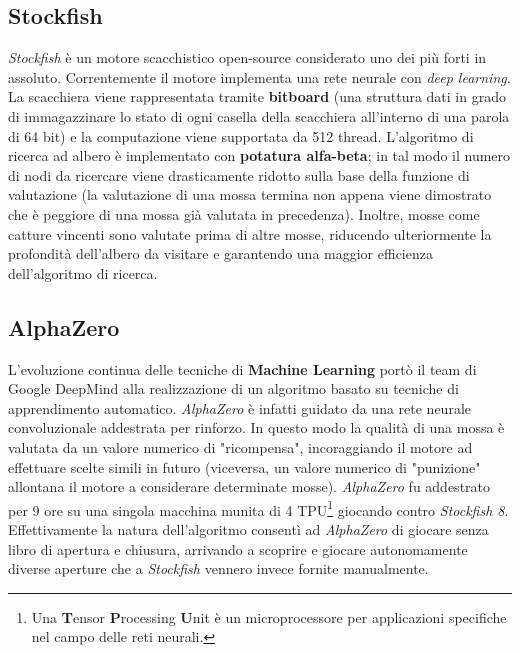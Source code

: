 \subsection{Stockfish}
\textit{Stockfish} è un motore scacchistico open-source considerato uno dei più forti in assoluto. Correntemente il motore implementa una rete neurale con \textit{deep learning}. La scacchiera viene rappresentata tramite \textbf{bitboard} (una struttura dati in grado di immagazzinare lo stato di ogni casella della scacchiera all’interno di una parola di 64 bit) e la computazione viene supportata da 512 thread. L'algoritmo di ricerca ad albero è implementato con \textbf{potatura alfa-beta}; in tal modo il numero di nodi da ricercare viene drasticamente ridotto sulla base della funzione di valutazione (la valutazione di una mossa termina non appena viene dimostrato che è peggiore di una mossa già valutata in precedenza). Inoltre, mosse come catture vincenti sono valutate prima di altre mosse, riducendo ulteriormente la profondità dell'albero da visitare e garantendo una maggior efficienza dell'algoritmo di ricerca\cite{enwiki:1105171756}.

\subsection{AlphaZero}
L'evoluzione continua delle tecniche di \textbf{Machine Learning} portò il team di Google DeepMind alla realizzazione di un algoritmo basato su tecniche di apprendimento automatico. \textit{AlphaZero} è infatti guidato da una rete neurale convoluzionale addestrata per rinforzo. In questo modo la qualità di una mossa è valutata da un valore numerico di "ricompensa", incoraggiando il motore ad effettuare scelte simili in futuro (viceversa, un valore numerico di "punizione" allontana il motore a considerare determinate mosse). \textit{AlphaZero} fu addestrato per 9 ore su una singola macchina munita di 4 TPU\footnote{Una \textbf{T}ensor \textbf{P}rocessing \textbf{U}nit è un microprocessore per applicazioni specifiche nel campo delle reti neurali.} giocando contro \textit{Stockfish 8}. Effettivamente la natura dell'algoritmo consentì ad \textit{AlphaZero} di giocare senza libro di apertura e chiusura, arrivando a scoprire e giocare autonomamente diverse aperture che a \textit{Stockfish} vennero invece fornite manualmente\cite{silver2018general}.

